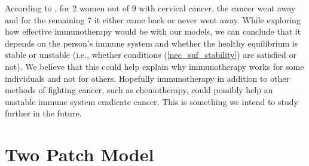 \documentclass[letter,10pt]{article}
\begin{document}

%
%
%



According to \cite{MD}, for 2 women out of 9 with cervical cancer, the cancer went away and for the remaining 7 it either came back or never went away. While exploring how effective immunotherapy would be with our models, we can conclude that it depends on the person's immune system and whether the healthy equilibrium  is stable or unstable (i.e., whether conditions (\ref{nec_suf_stability}) are satisfied or not). We believe that this could help explain why immunotherapy  works for some individuals and not for others.  Hopefully immunotherapy in addition to other methods of fighting cancer, such as chemotherapy, could possibly help an unstable immune system eradicate cancer. This is something we intend to study further in the future.


\section{Two Patch Model}
\end{document}
